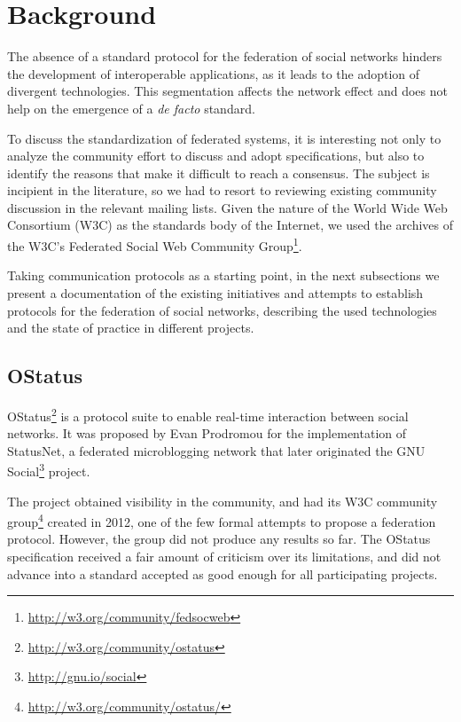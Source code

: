 \chapter{Background}
\label{chapter:2}

The absence of a standard protocol for the federation of social networks
hinders the development of interoperable applications, as it leads to
the adoption of divergent technologies. This segmentation affects the
network effect and does not help on the emergence of a \textit{de facto}
standard.

To discuss the standardization of federated systems, it is interesting not only
to analyze the community effort to discuss and adopt specifications, but also
to identify the reasons that make it difficult to reach a consensus. The
subject is incipient in the literature, so we had to resort to reviewing
existing community discussion in the relevant mailing lists. Given the nature
of the World Wide Web Consortium (W3C) as the standards body of the Internet,
we used the archives of the W3C's Federated Social Web Community
Group\footnote{\url{http://w3.org/community/fedsocweb}}.

Taking communication protocols \cite{protocols2017} as a starting
point, in the next subsections we present a documentation of the existing
initiatives and attempts to establish protocols for the federation of social
networks, describing the used technologies and the state of practice in
different projects.


\section{OStatus}

OStatus\footnote{\url{http://w3.org/community/ostatus}} is a protocol suite to
enable real-time interaction between social networks.  It was proposed by Evan
Prodromou for the implementation of StatusNet, a federated microblogging
network that later originated the GNU
Social\footnote{\url{http://gnu.io/social}} project.

The project obtained visibility in the community, and had its W3C community
group\footnote{\url{http://w3.org/community/ostatus/}} created in 2012, one of
the few formal attempts to propose a federation protocol. However, the group
did not produce any results so far. The OStatus specification received a fair
amount of criticism over its limitations, and did not advance into a standard
accepted as good enough for all participating projects.

